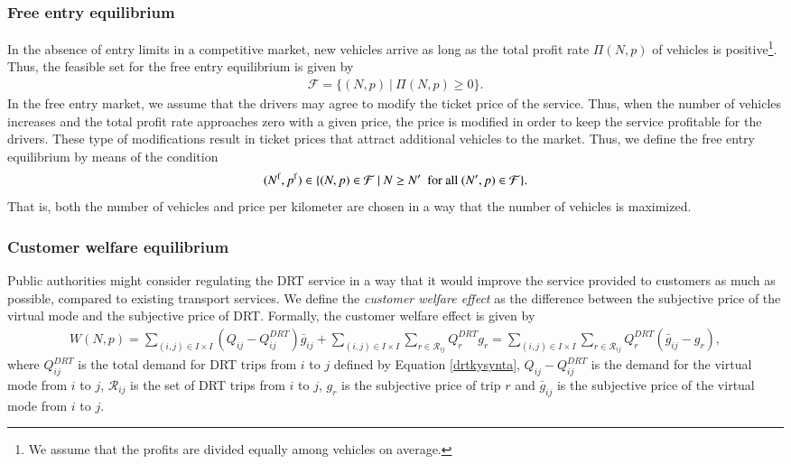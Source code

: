 \documentclass[dissertation,draft*]{aaltoseries}
\begin{document}
\subsubsection{Free entry equilibrium}
In the absence of entry limits in a competitive market, new vehicles arrive as long as 
the total profit rate $\Pi(N,p)$ of vehicles is positive\footnote{We assume that the profits are 
divided equally among vehicles on average.}. 
Thus, the feasible set for the free entry equilibrium is given by
\begin{align}
\mathcal{F} = \{(N,p) \ | \ \Pi(N,p) \geq 0 \}.
\end{align}
In the free entry market, we assume that the drivers may agree to modify the ticket price of the service.
Thus, when the number of vehicles increases and the total profit rate approaches zero with a given 
price, the price is modified in order to keep the service profitable for the drivers.
These type of modifications result in ticket prices that attract additional vehicles to the market.
Thus, we define the free entry equilibrium by means of the condition
\begin{align}
\label{freeentry}
(N^{\rm f},p^{\rm f}) \in \{ (N,p) \in \mathcal{F} \ | \ N \geq N' \ \mbox{ for all } (N',p) \in \mathcal{F} \}.
\end{align}
That is, both the number of vehicles and price per kilometer are chosen in a way that the 
number of vehicles is maximized.

\subsubsection{Customer welfare equilibrium}
Public authorities might consider regulating the DRT service in a way that it would
improve the service provided to customers as much as possible, compared
to existing transport services. We define the \emph{customer welfare effect}
as the difference between the subjective price of the virtual mode and 
the subjective price of DRT. Formally, the customer welfare effect is given by
\begin{align}
W(N,p) = \sum_{(i,j) \in I \times I} \left(Q_{ij} - Q^{DRT}_{ij}\right) \bar{g}_{ij} 
+ \sum_{(i,j) \in I \times I} \sum_{r \in \mathcal{R}_{ij}} Q^{DRT}_r  g_r = 
\sum_{(i,j) \in I \times I} \sum_{r \in \mathcal{R}_{ij}} Q^{DRT}_r  (\bar{g}_{ij}-g_r),
\end{align}
where $Q^{DRT}_{ij}$ is the total demand for DRT trips from $i$ to $j$ defined by Equation \eqref{drtkysynta},
$Q_{ij} - Q^{DRT}_{ij}$ is the demand for the virtual mode from $i$ to $j$, $\mathcal{R}_{ij}$
is the set of DRT trips from $i$ to $j$, $g_r$ is the subjective price
of trip $r$ and $\bar{g}_{ij}$ is the subjective price of the virtual mode from $i$ to $j$.
\end{document}
